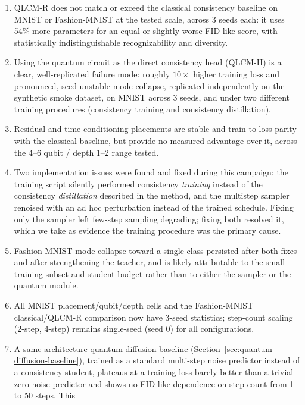 \documentclass[11pt]{article}
\begin{document}
\begin{enumerate}
    \item QLCM-R does not match or exceed the classical consistency baseline
    on MNIST or Fashion-MNIST at the tested scale, across 3 seeds each: it
    uses 54\% more parameters for an equal or slightly worse FID-like score,
    with statistically indistinguishable recognizability and diversity.
    \item Using the quantum circuit as the direct consistency head (QLCM-H)
    is a clear, well-replicated failure mode: roughly $10\times$ higher
    training loss and pronounced, seed-unstable mode collapse, replicated
    independently on the synthetic smoke dataset, on MNIST across 3 seeds,
    and under two different training procedures (consistency training and
    consistency distillation).
    \item Residual and time-conditioning placements are stable and train to
    loss parity with the classical baseline, but provide no measured
    advantage over it, across the 4--6 qubit / depth 1--2 range tested.
    \item Two implementation issues were found and fixed during this
    campaign: the training script silently performed consistency
    \emph{training} instead of the consistency \emph{distillation} described
    in the method, and the multistep sampler renoised with an ad hoc
    perturbation instead of the trained schedule. Fixing only the sampler
    left few-step sampling degrading; fixing both resolved it, which we take
    as evidence the training procedure was the primary cause.
    \item Fashion-MNIST mode collapse toward a single class persisted after
    both fixes and after strengthening the teacher, and is likely attributable
    to the small training subset and student budget rather than to either
    the sampler or the quantum module.
    \item All MNIST placement/qubit/depth cells and the Fashion-MNIST
    classical/QLCM-R comparison now have 3-seed statistics; step-count
    scaling (2-step, 4-step) remains single-seed (seed 0) for all
    configurations.
    \item A same-architecture quantum diffusion baseline
    (Section~\ref{sec:quantum-diffusion-baseline}), trained as a standard
    multi-step noise predictor instead of a consistency student, plateaus at
    a training loss barely better than a trivial zero-noise predictor and
    shows no FID-like dependence on step count from 1 to 50 steps. This

\end{enumerate}
\end{document}
